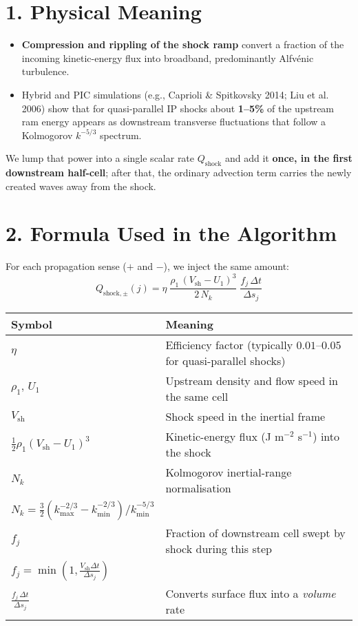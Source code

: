 \section*{1. Physical Meaning}

\begin{itemize}
    \item \textbf{Compression and rippling of the shock ramp} convert a fraction of the incoming kinetic-energy flux into broadband, predominantly Alfvénic turbulence.
    \item Hybrid and PIC simulations (e.g., Caprioli \& Spitkovsky 2014; Liu et al. 2006) show that for quasi-parallel IP shocks about \textbf{1--5\%} of the upstream ram energy appears as downstream transverse fluctuations that follow a Kolmogorov $k^{-5/3}$ spectrum.
\end{itemize}

We lump that power into a single scalar rate $Q_{\text{shock}}$ and add it \textbf{once, in the first downstream half-cell}; after that, the ordinary advection term carries the newly created waves away from the shock.

\section*{2. Formula Used in the Algorithm}

For each propagation sense ($+$ and $-$), we inject the same amount:
\begin{equation}
\boxed{
Q_{\text{shock},\pm}(j)
   = \eta\;
     \frac{\rho_1\,(V_{\text{sh}} - U_1)^3}{2\,N_k}\;
     \frac{f_j\,\Delta t}{\Delta s_j}
}
\label{eq:Qshock}
\end{equation}

\begin{center}
\renewcommand{\arraystretch}{1.3}
\begin{tabular}{@{}ll@{}}
\toprule
\textbf{Symbol} & \textbf{Meaning} \\
\midrule
$\eta$ & Efficiency factor (typically $0.01$--$0.05$ for quasi-parallel shocks) \\
$\rho_1,\,U_1$ & Upstream density and flow speed in the same cell \\
$V_{\text{sh}}$ & Shock speed in the inertial frame \\
$\frac{1}{2}\rho_1 (V_{\text{sh}} - U_1)^3$ & Kinetic-energy flux (J m$^{-2}$ s$^{-1}$) into the shock \\
$N_k$ & Kolmogorov inertial-range normalisation \\
$N_k = \tfrac{3}{2}(k_{\max}^{-2/3} - k_{\min}^{-2/3}) / k_{\min}^{-5/3}$ &  \\
$f_j$ & Fraction of downstream cell swept by shock during this step \\
$f_j = \min\left(1, \frac{V_{\text{sh}} \Delta t}{\Delta s_j}\right)$ &  \\
$\frac{f_j\,\Delta t}{\Delta s_j}$ & Converts surface flux into a \textit{volume} rate \\
\bottomrule
\end{tabular}
\end{center}

